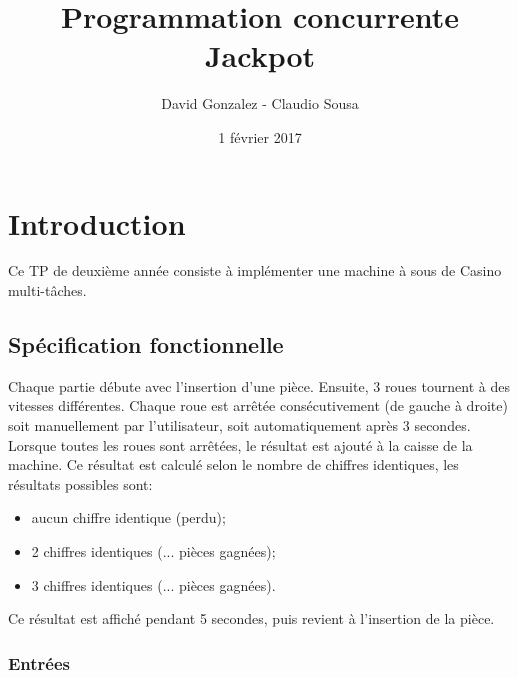 \documentclass[11pt, a4paper]{article}
\begin{document}
\title
{
    \Huge{Programmation concurrente} \\
    \Huge{Jackpot}
}
\author
{
    \LARGE{David Gonzalez - Claudio Sousa}
}
\date{1 février 2017}
\maketitle

\begin{center}
\end{center}

\thispagestyle{empty}

\newpage

\section{Introduction}

Ce TP de deuxième année consiste à implémenter une machine à sous de Casino multi-tâches.

\subsection{Spécification fonctionnelle}

Chaque partie débute avec l'insertion d'une pièce.
Ensuite, 3 roues tournent à des vitesses différentes.
Chaque roue est arrêtée consécutivement (de gauche à droite)
soit manuellement par l'utilisateur, soit automatiquement après 3 secondes. \\

Lorsque toutes les roues sont arrêtées, le résultat est ajouté à la caisse de la machine.
Ce résultat est calculé selon le nombre de chiffres identiques, les résultats possibles sont:
\begin{itemize}
    \item aucun chiffre identique (perdu);
    \item 2 chiffres identiques (... pièces gagnées);
    \item 3 chiffres identiques (... pièces gagnées). \\
\end{itemize}

Ce résultat est affiché pendant 5 secondes, puis revient à l'insertion de la pièce.

\subsubsection{Entrées}
\end{document}
